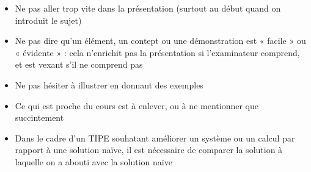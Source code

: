 \documentclass{article}
\begin{document}
\begin{itemize}
    \item Ne pas aller trop vite dans la présentation (surtout au début quand on introduit le sujet)
    \item Ne pas dire qu'un élément, un contept ou une démonstration est « facile » ou « évidente » : cela n'enrichit pas la présentation si l'examinateur comprend, et est vexant s'il ne comprend pas
    \item Ne pas hésiter à illustrer en donnant des exemples
    \item Ce qui est proche du cours est à enlever, ou à ne mentionner que succintement
    \item Dans le cadre d'un TIPE souhatant améliorer un système ou un calcul par rapport à une solution naïve, il est nécessaire de comparer la solution à laquelle on a abouti avec la solution naïve
\end{itemize}
\end{document}
